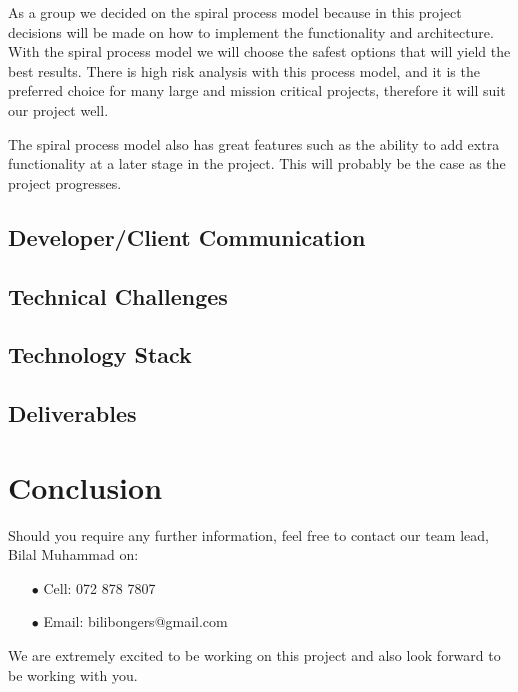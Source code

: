 \documentclass[a4paper,12pt]{article}
\begin{document}
	{\noindent}As a group we decided on the spiral process model because in this project decisions will be made on how to implement the functionality and architecture. With the spiral process model we will choose the safest options that will yield the best results. There is high risk analysis with this process model, and it is the preferred choice for many large and mission critical projects, therefore it will suit our project well.

	{\noindent}The spiral process model also has great features such as the ability to add extra functionality at a later stage in the project. This will probably be the case as the project progresses.

	
	\newpage
	\subsection{Developer/Client Communication}
	
	\newpage
	\subsection{Technical Challenges}
	
	\newpage
	\subsection{Technology Stack}
	
	\newpage
	\subsection{Deliverables}
	
	
	\newpage
	\section{Conclusion}
	
	Should you require any further information, feel free to contact our team lead, Bilal Muhammad on:
	
	\begin{itemize}
		\item[$\bullet$]Cell: 072 878 7807
		\item[$\bullet$]Email: bilibongers@gmail.com
	\end{itemize}
	We are extremely excited to be working on this project and also look forward to be working with you.
	
	
\end{document}
